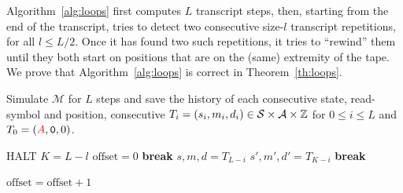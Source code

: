 Algorithm~\ref{alg:loops} first computes $L$ transcript steps, then, starting from the end of the transcript, tries to detect two consecutive size-$l$ transcript repetitions, for all $l \leq L/2$. Once it has found two such repetitions, it tries to ``rewind'' them until they both start on positions that are on the (same) extremity of the tape. We prove that Algorithm~\ref{alg:loops} is correct in Theorem~\ref{th:loops}.




\begin{algorithm}
    \caption{{\sc decider-Loops}, reformulates the algorithm \texttt{loop1\_decider} of Coq-BB5.}\label{alg:loops}

    \begin{algorithmic}[1]

        \State
        \State Simulate $\mathcal{M}$ for $L$ steps and save the history of each consecutive state, read-symbol and position, \ie consecutive $T_i = (s_i,m_i,d_i)\in\mathcal{S}\times\mathcal{A}\times\mathbb{Z}$ for $0 \leq i \leq L$ and $T_0 = (\stateA,\symbolzero,0)$.


        \State {}
        \State \Return HALT \label{alg:loops:halt}
        \EndIf
        \State {} 
        \State $K = L-l$
        \State $\text{offset} = 0$ 
        \State \For{$i$ \textbf{in} $[0,l+\text{offset}[$ }
        \State \textbf{break}
        \State \EndIf
        \State $s,m,d = T_{L-i}$
        \State $s',m',d' = T_{K-i}$
        \State
        \label{alg:loops:testeq} 
        \State \textbf{break}
        \EndIf

        \State {}
        \label{alg:loops:cycler}
        \State \Return \NONHALT {}
        \EndIf
        \State {}\label{alg:loops:tcplus}
        \State \Return \NONHALT {}
        \EndIf
        \State {}\label{alg:loops:tcminus}
        \State \Return \NONHALT {}
        \State \EndIf
        \State $\text{offset} = \text{offset} + 1$
        \State \EndIf
        \EndFor
        \EndFor

        \State \Return \UNKNOWN

    \end{algorithmic}

\end{algorithm}



